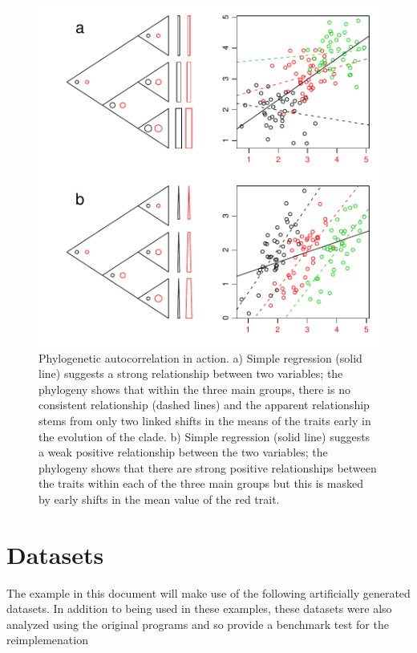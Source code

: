 \documentclass[a4paper]{article}
\begin{document}
\begin{figure}[htbp]
  \begin{center}
\includegraphics{caic-001}
    \caption{Phylogenetic autocorrelation in action. a) Simple regression (solid line) suggests a strong relationship between two variables; the phylogeny shows that within the three main groups, there is no consistent relationship (dashed lines) and the apparent relationship stems from only two linked shifts in the means of the traits early in the evolution of the clade. b) Simple regression (solid line) suggests a weak positive relationship between the two variables; the phylogeny shows that there are strong positive relationships between the traits within each of the three main groups but this is masked by early shifts in the mean value of the red trait.}
    \label{whyCAIC}
  \end{center}
\end{figure}



\section{Datasets}

The example in this document will make use of the following artificially generated datasets. In addition to being used in these examples, these datasets were also analyzed using the original programs and so  provide a benchmark test for the reimplemenation
\end{document}
